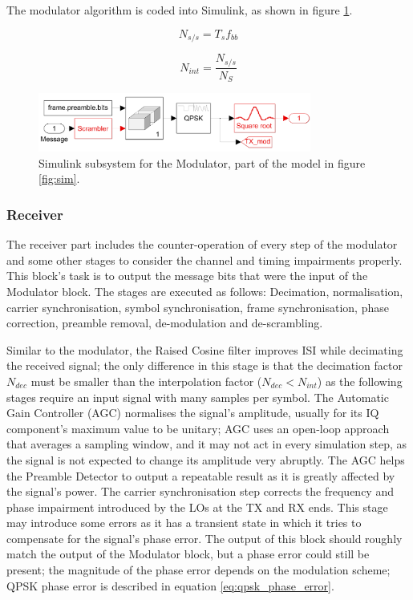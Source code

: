 \documentclass[12pt,a4paper]{report}
\begin{document}
The modulator algorithm is coded into Simulink, as shown in figure \ref{fig:sl:modulator}.

\begin{equation}
    N_{s/s} = T_s f_{bb}
    \label{eq:sym_per_step}
\end{equation}

\begin{equation}
    N_{int} = \frac{N_{s/s}}{N_S}
    \label{eq:inter}
\end{equation}

\begin{figure}[h]
    \centering
    \includegraphics[width = 0.8\textwidth]{Figures/SL_modulator.png}
    \caption[Simulink subsystem for the Modulator]{Simulink subsystem for the Modulator, part of the model in figure \ref{fig:sim}.}
    \label{fig:sl:modulator}
\end{figure}

\subsubsection{Receiver} \label{met:sim:mod:rec}
The receiver part includes the counter-operation of every step of the modulator and some other stages to consider the channel and timing impairments properly. This block's task is to output the message bits that were the input of the Modulator block. The stages are executed as follows: Decimation, normalisation, carrier synchronisation, symbol synchronisation, frame synchronisation, phase correction, preamble removal, de-modulation and de-scrambling.

Similar to the modulator, the Raised Cosine filter improves ISI while decimating the received signal; the only difference in this stage is that the decimation factor $N_{dec}$ must be smaller than the interpolation factor ($N_{dec} < N_{int}$) as the following stages require an input signal with many samples per symbol. The Automatic Gain Controller (AGC) normalises the signal's amplitude, usually for its IQ component's maximum value to be unitary; AGC uses an open-loop approach that averages a sampling window, and it may not act in every simulation step, as the signal is not expected to change its amplitude very abruptly. The AGC helps the Preamble Detector to output a repeatable result as it is greatly affected by the signal's power. The carrier synchronisation step corrects the frequency and phase impairment introduced by the LOs at the TX and RX ends. This stage may introduce some errors as it has a transient state in which it tries to compensate for the signal's phase error. The output of this block should roughly match the output of the Modulator block, but a phase error could still be present; the magnitude of the phase error depends on the modulation scheme; QPSK phase error is described in equation \ref{eq:qpsk_phase_error}. 
\end{document}
